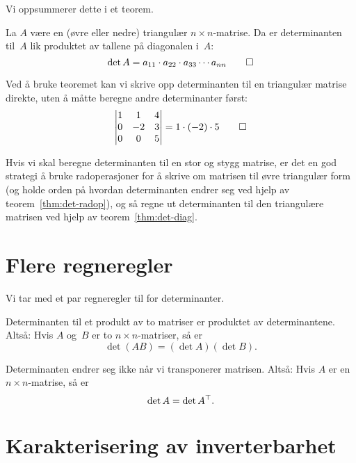 Vi oppsummerer dette i et teorem.

\begin{thm}
\label{thm:det-diag}
La $A$ være en (øvre eller nedre) triangulær $n \times n$-matrise.  Da
er determinanten til~$A$ lik produktet av tallene på diagonalen i~$A$:
\[
\det A = a_{11} \cdot a_{22} \cdot a_{33} \cdots a_{nn}\qedhere
\]
\end{thm}

\begin{ex}
Ved å bruke teoremet kan vi skrive opp determinanten til en triangulær
matrise direkte, uten å måtte beregne andre determinanter først:
\[
\begin{vmatrix}
1 &  1 &  4 \\
0 & -2 &  3 \\
0 &  0 &  5
\end{vmatrix}
= 1 \cdot (-2) \cdot 5
\qedhere
\]
\end{ex}

Hvis vi skal beregne determinanten til en stor og stygg matrise, er
det en god strategi å bruke radoperasjoner for å skrive om matrisen
til øvre triangulær form (og holde orden på hvordan determinanten
endrer seg ved hjelp av teorem~\ref{thm:det-radop}), og så regne ut
determinanten til den triangulære matrisen ved hjelp av
teorem~\ref{thm:det-diag}.


\section*{Flere regneregler}

Vi tar med et par regneregler til for determinanter.

\begin{thm}
\label{thm:det-produkt}
Determinanten til et produkt av to matriser er produktet av
determinantene.  Altså: Hvis $A$ og~$B$ er to $n \times n$-matriser,
så er
\[
\det (AB) = (\det A) (\det B).
\]
\end{thm}

\begin{thm}
\label{thm:det-tr}
Determinanten endrer seg ikke når vi transponerer matrisen.  Altså:
Hvis $A$ er en $n \times n$-matrise, så er
\[
\det A = \det A^\top.
\]
\end{thm}


\section*{Karakterisering av inverterbarhet}

